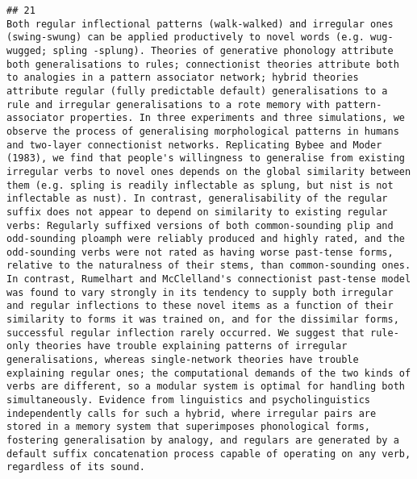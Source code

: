 \documentclass[
  english,
  man]{apa6}
\begin{document}
\begin{verbatim}
## 21                                                                                                                                                                                                                                                                                                                           Both regular inflectional patterns (walk-walked) and irregular ones (swing-swung) can be applied productively to novel words (e.g. wug-wugged; spling -splung). Theories of generative phonology attribute both generalisations to rules; connectionist theories attribute both to analogies in a pattern associator network; hybrid theories attribute regular (fully predictable default) generalisations to a rule and irregular generalisations to a rote memory with pattern-associator properties. In three experiments and three simulations, we observe the process of generalising morphological patterns in humans and two-layer connectionist networks. Replicating Bybee and Moder (1983), we find that people's willingness to generalise from existing irregular verbs to novel ones depends on the global similarity between them (e.g. spling is readily inflectable as splung, but nist is not inflectable as nust). In contrast, generalisability of the regular suffix does not appear to depend on similarity to existing regular verbs: Regularly suffixed versions of both common-sounding plip and odd-sounding ploamph were reliably produced and highly rated, and the odd-sounding verbs were not rated as having worse past-tense forms, relative to the naturalness of their stems, than common-sounding ones. In contrast, Rumelhart and McClelland's connectionist past-tense model was found to vary strongly in its tendency to supply both irregular and regular inflections to these novel items as a function of their similarity to forms it was trained on, and for the dissimilar forms, successful regular inflection rarely occurred. We suggest that rule-only theories have trouble explaining patterns of irregular generalisations, whereas single-network theories have trouble explaining regular ones; the computational demands of the two kinds of verbs are different, so a modular system is optimal for handling both simultaneously. Evidence from linguistics and psycholinguistics independently calls for such a hybrid, where irregular pairs are stored in a memory system that superimposes phonological forms, fostering generalisation by analogy, and regulars are generated by a default suffix concatenation process capable of operating on any verb, regardless of its sound.

\end{verbatim}
\end{document}
